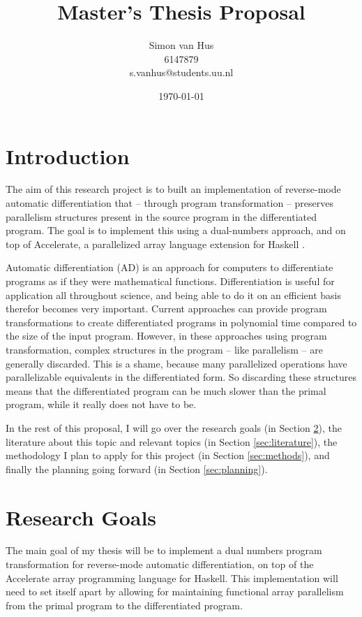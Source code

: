 \documentclass{article}
\title{Master's Thesis Proposal}
\author{Simon van Hus\\6147879\\s.vanhus@students.uu.nl}
\date{\today}
\begin{document}
    \maketitle

    \section{Introduction} \label{sec:introduction}
        The aim of this research project is to built an implementation of reverse-mode automatic differentiation that -- through program transformation -- preserves parallelism structures present in the source program in the differentiated program.
        The goal is to implement this using a dual-numbers approach, and on top of Accelerate, a parallelized array language extension for Haskell \cite{haskell}.

        Automatic differentiation (AD) is an approach for computers to differentiate programs as if they were mathematical functions.
        Differentiation is useful for application all throughout science, and being able to do it on an efficient basis therefor becomes very important.
        Current approaches can provide program transformations to create differentiated programs in polynomial time compared to the size of the input program.
        However, in these approaches using program transformation, complex structures in the program -- like parallelism -- are generally discarded.
        This is a shame, because many parallelized operations have parallelizable equivalents in the differentiated form.
        So discarding these structures means that the differentiated program can be much slower than the primal program, while it really does not have to be.

        In the rest of this proposal, I will go over the research goals (in Section \ref{sec:goals}), the literature about this topic and relevant topics (in Section \ref{sec:literature}), the methodology I plan to apply for this project (in Section \ref{sec:methods}), and finally the planning going forward (in Section \ref{sec:planning}).

    \section{Research Goals} \label{sec:goals}
        The main goal of my thesis will be to implement a dual numbers program transformation for reverse-mode automatic differentiation, on top of the Accelerate array programming language for Haskell.
        This implementation will need to set itself apart by allowing for maintaining functional array parallelism from the primal program to the differentiated program.
\end{document}
